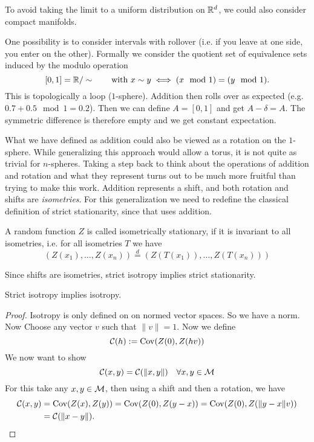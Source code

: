 To avoid taking the limit to a uniform distribution on \(\mathbb{R}^d\), we could
also consider compact manifolds.

\begin{example}[1-sphere]
	One possibility is to consider intervals with
	rollover (i.e. if you leave at one side, you enter on the other). Formally
	we consider the quotient set of equivalence sets induced by the modulo operation
	\[
		[0,1] = \mathbb{R}/\sim \qquad \text{with } x\sim y \iff (x\mod 1) = (y\mod 1).
	\]
	This is topologically a loop (\(1\)-sphere). Addition then rolls over as expected (e.g. \(0.7
	+ 0.5 \mod 1 = 0.2\)).  Then we can define \(A=[0,1]\) and get \(A-\delta = A\).
	The symmetric difference is therefore empty and we get constant expectation.
\end{example}

What we have defined as addition could also be viewed as a rotation on the
\(1\)-sphere. While generalizing this approach would allow a torus, it is not quite
as trivial for \(n\)-spheres. Taking a step back to think about the operations
of addition and rotation and what they represent turns out to be much more
fruitful than trying to make this work. Addition represents a shift, and both
rotation and shifts are \emph{isometries}. For this generalization we need to
redefine the classical definition of strict stationarity, since that uses addition.
\begin{definition}
	A random function \(Z\) is called isometrically stationary, if it is invariant to
	all isometries, i.e. for all isometries \(T\) we have
	\[
		(Z(x_1), \dots, Z(x_n))
		\overset{d}= (Z(T(x_1)), \dots, Z(T(x_n)))
	\]
\end{definition}
\begin{remark}
Since shifts are isometries, strict isotropy implies strict stationarity.
\end{remark}
\begin{lemma}
	Strict isotropy implies isotropy.
\end{lemma}
\begin{proof}
	Isotropy is only defined on on normed vector spaces. So we have a norm. Now
	Choose any vector \(v\) such that \(\|v\|=1\). Now we define
	\[
		\mathcal{C}(h):= \operatorname{Cov}(Z(0), Z(hv))
	\]
	We now want to show
	\[
		\mathcal{C}(x,y) = \mathcal{C}(\|x,y\|) \quad \forall x,y\in \mathcal{M}
	\]
	For this take any \(x,y\in \mathcal{M}\), then using
	a shift and then a rotation, we have
	\begin{align*}
		\mathcal{C}(x,y)
		&= \operatorname{Cov}(Z(x), Z(y))
		= \operatorname{Cov}(Z(0), Z(y-x))
		= \operatorname{Cov}(Z(0), Z(\|y-x\|v))\\
		&= \mathcal{C}(\|x-y\|).
		\qedhere
	\end{align*}
\end{proof}

